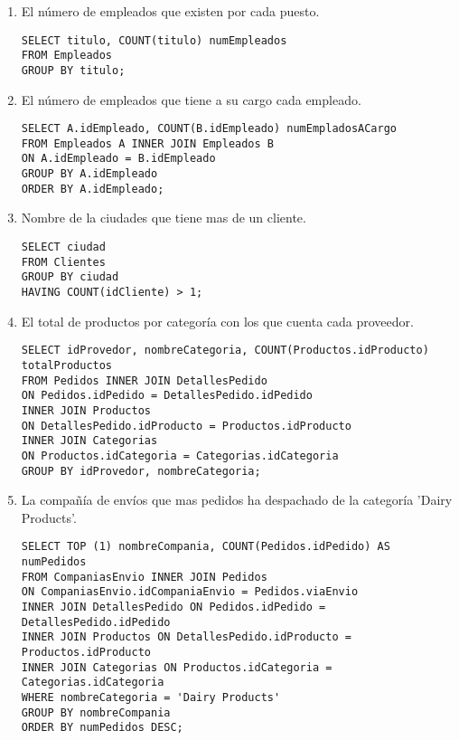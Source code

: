 \documentclass[12pt, letterpaper]{article}
\begin{document}
    \begin{enumerate}
        \item El número de empleados que existen por cada puesto.

            \begin{verbatim}
SELECT titulo, COUNT(titulo) numEmpleados
FROM Empleados
GROUP BY titulo; 
            \end{verbatim}

        \item El número de empleados que tiene a su cargo cada empleado.
        
            \begin{verbatim}
SELECT A.idEmpleado, COUNT(B.idEmpleado) numEmpladosACargo
FROM Empleados A INNER JOIN Empleados B
ON A.idEmpleado = B.idEmpleado
GROUP BY A.idEmpleado
ORDER BY A.idEmpleado;
            \end{verbatim}

        \item Nombre de la ciudades que tiene mas de un cliente.
            
            \begin{verbatim}
SELECT ciudad
FROM Clientes
GROUP BY ciudad
HAVING COUNT(idCliente) > 1;
            \end{verbatim}

        \item El total de productos por categoría con los que cuenta cada proveedor.
        
            \begin{verbatim}
SELECT idProvedor, nombreCategoria, COUNT(Productos.idProducto) totalProductos
FROM Pedidos INNER JOIN DetallesPedido
ON Pedidos.idPedido = DetallesPedido.idPedido
INNER JOIN Productos
ON DetallesPedido.idProducto = Productos.idProducto
INNER JOIN Categorias
ON Productos.idCategoria = Categorias.idCategoria
GROUP BY idProvedor, nombreCategoria;
            \end{verbatim}

        \item La compañía de envíos que mas pedidos ha despachado de la categoría 'Dairy Products'.
        
            \begin{verbatim}
SELECT TOP (1) nombreCompania, COUNT(Pedidos.idPedido) AS numPedidos
FROM CompaniasEnvio INNER JOIN Pedidos 
ON CompaniasEnvio.idCompaniaEnvio = Pedidos.viaEnvio
INNER JOIN DetallesPedido ON Pedidos.idPedido = DetallesPedido.idPedido
INNER JOIN Productos ON DetallesPedido.idProducto = Productos.idProducto
INNER JOIN Categorias ON Productos.idCategoria = Categorias.idCategoria
WHERE nombreCategoria = 'Dairy Products'
GROUP BY nombreCompania
ORDER BY numPedidos DESC;
            \end{verbatim}


\end{enumerate}
\end{document}
